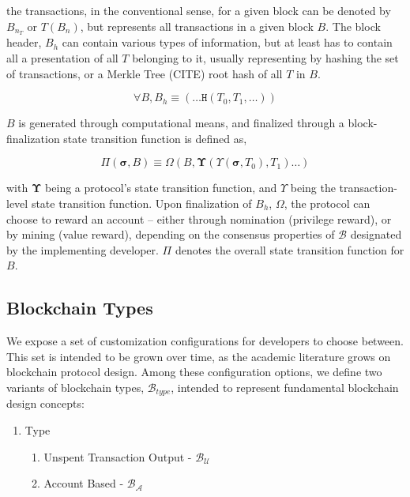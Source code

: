 \documentclass[12pt, titlepage, twocolumn]{report}
\begin{document}
the transactions, in the conventional sense, for a given block can be denoted by \(B_{n_{T}}\) or \(T(B_n)\), but represents all transactions in a given block \(B\). The block header, \(B_h\) can contain various types of information, but at least has to contain all a presentation of all \(T\) belonging to it, usually representing by hashing the set of transactions, or a Merkle Tree (CITE) root hash of all \(T\) in \(B\).

\begin{equation}
\forall B, B_h \equiv (\ldots \texttt{H}(T_0, T_1, \ldots))
\end{equation}

\(B\) is generated through computational means, and finalized through a block-finalization state transition function is defined as,

\begin{equation}
\Pi (\boldsymbol{\sigma}, B) \equiv \Omega(B, \boldsymbol{\Upsilon}(\Upsilon(\boldsymbol{\sigma},T_0), T_1) \ldots )
\end{equation}

with \(\boldsymbol{\Upsilon}\) being a protocol's state transition function, and \(\Upsilon\) being the transaction-level state transition function. Upon finalization of \(B_h\), \(\Omega\), the protocol can choose to reward an account -- either through nomination (privilege reward), or by mining (value reward), depending on the consensus properties of \(\boldsymbol{\mathcal{B}}\) designated by the implementing developer. \(\Pi\) denotes the overall state transition function for \(B\).


\subsection{Blockchain Types}
We expose a set of customization configurations for developers to choose between. This set is intended to be grown over time, as the academic literature grows on blockchain protocol design. Among these configuration options, we define two variants of blockchain types, \(\boldsymbol{\mathcal{B}}_{type}\), intended to represent fundamental blockchain design concepts:

\begin{enumerate}
 \item Type
	\begin{enumerate}
 		\item Unspent Transaction Output - \(\boldsymbol{\mathcal{B}}_{\mathcal{U}}\)
		\item Account Based - \(\boldsymbol{\mathcal{B}}_{\mathcal{A}}\)
	\end{enumerate}
\end{enumerate}
\end{document}
